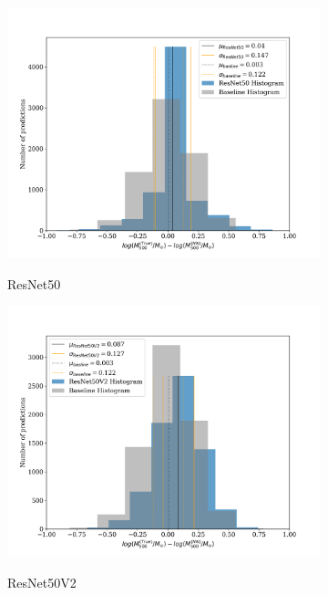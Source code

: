 \begin{figure}[H]
\begin{subfigure}{.325\textwidth}
    \centering
    \includegraphics[width=\linewidth]{images/Chapter4/Results/training_ResNet50_hist.png}
    \label{fig:training_ResNet50_hist}
    \caption{ResNet50}
\end{subfigure}
\begin{subfigure}{.325\textwidth}
    \centering
    \includegraphics[width=\linewidth]{images/Chapter4/Results/training_ResNet50V2_hist.png}
    \label{fig:training_ResNet50V2_hist}
    \caption{ResNet50V2}
\end{subfigure}
\begin{subfigure}{.325\textwidth}

\end{subfigure}
\end{figure}
